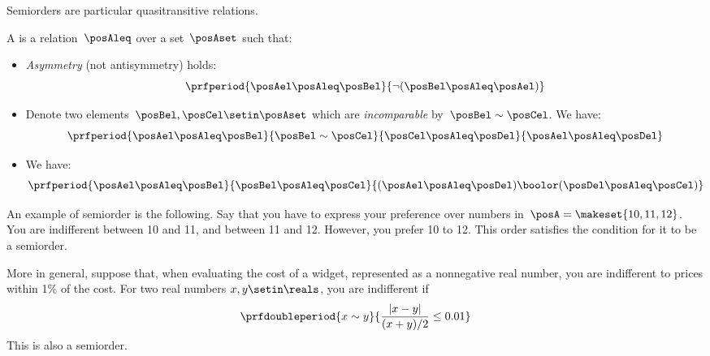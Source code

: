 Semiorders are particular quasitransitive relations.
\begin{definition}[Semiorder]\label{def:semiorder}
    A  is a relation~$\posAleq$ over a set~$\posAset$ such that:
    \begin{itemize}
        \item \emph{Asymmetry} (not antisymmetry) holds:
              \begin{equation}\label{eq:semiorder-asym}
                  \prfperiod{
                      \posAel \posAleq \posBel
                  }{
                      \neg(\posBel \posAleq \posAel)
                  }
              \end{equation}
        \item Denote two elements~$\posBel, \posCel \setin \posAset$ which are \emph{incomparable} by~$\posBel \sim \posCel$.
              We have:
              \begin{equation}\label{eq:el-incomparable}
                  \prfperiod{
                      \posAel \posAleq \posBel
                  }{
                      \posBel \sim \posCel
                  }{
                      \posCel \posAleq \posDel
                  }{
                      \posAel \posAleq \posDel
                  }
              \end{equation}
        \item We have:
              \begin{equation}\label{eq:semiorder-2}
                  \prfperiod{
                      \posAel \posAleq \posBel
                  }{
                      \posBel \posAleq \posCel
                  }{
                      (\posAel \posAleq \posDel) \boolor (\posDel \posAleq \posCel)
                  }
              \end{equation}
    \end{itemize}

\end{definition}
\begin{example}
    An example of semiorder is the following.
    Say that you have to express your preference over numbers in~$\posA=\makeset{10,11,12}$.
    You are indifferent between 10 and 11, and between 11 and 12.
    However, you prefer 10 to 12.
    This order satisfies the condition for it to be a semiorder.

    More in general, suppose that, when evaluating the cost of a widget, represented as a nonnegative real number, you are indifferent to prices within 1\% of the cost.
    For two real numbers $x,y\setin\reals$, you are indifferent if
    \begin{equation}\label{eq:semiorder-tolerances}
        \prfdoubleperiod{
            x \sim y
        }{
            \frac{| x - y |}{ (x+y)/2} \leq 0.01
        }
    \end{equation}
    This is also a semiorder.
\end{example}

